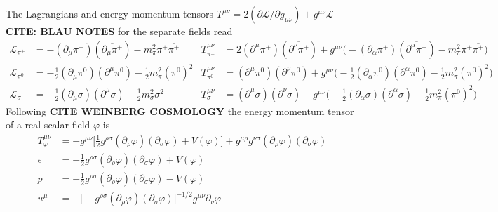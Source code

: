 The Lagrangians and energy-momentum tensors $T^{\mu\nu}=2(\partial\mathscr{L}/\partial g_{\mu\nu})+g^{\mu\nu}\mathscr{L}$ \textbf{CITE: BLAU NOTES} for the separate fields read
\begin{subequations}
    \begin{align}
        \mathscr{L}_{\pi^\pm}&=-(\partial_\mu\pi^+)(\overline{\partial_\mu\pi^+})-m_\pi^2\pi^+\overline{\pi^+}&T^{\mu\nu}_{\pi^\pm}&=2(\partial^\mu\pi^+)(\overline{\partial^\nu\pi^+})+g^{\mu\nu}\big(-(\partial_\alpha\pi^+)(\overline{\partial^\alpha\pi^+})-m_\pi^2\pi^+\overline{\pi^+}\big)\\
        \mathscr{L}_{\pi^0}&=-\frac{1}{2}(\partial_\mu\pi^0)(\partial^\mu\pi^0)-\frac{1}{2}m_\pi^2(\pi^0)^2&T^{\mu\nu}_{\pi^0}&=(\partial^\mu\pi^0)(\partial^\nu\pi^0)+g^{\mu\nu}\big(-\frac{1}{2}(\partial_\alpha\pi^0)(\partial^\alpha\pi^0)-\frac{1}{2}m_\pi^2(\pi^0)^2\big)\\
        \mathscr{L}_\sigma&=-\frac{1}{2}(\partial_\mu\sigma)(\partial^\mu\sigma)-\frac{1}{2}m_\sigma^2\sigma^2&T^{\mu\nu}_{\sigma}&=(\partial^\mu\sigma)(\partial^\nu\sigma)+g^{\mu\nu}\big(-\frac{1}{2}(\partial_\alpha\sigma)(\partial^\alpha\sigma)-\frac{1}{2}m_\pi^2(\pi^0)^2\big)
    \end{align}
\end{subequations}
Following \textbf{CITE WEINBERG COSMOLOGY} the energy momentum tensor of a real scalar field $\varphi$ is
\begin{subequations}
    \begin{align}
        T_\varphi^{\mu\nu}&=-g^{\mu\nu}\big[\frac{1}{2}g^{\rho\sigma}(\partial_\rho\varphi)(\partial_\sigma\varphi)+V(\varphi)\big]+g^{\mu\rho}g^{\nu\sigma}(\partial_\rho\varphi)(\partial_\sigma\varphi)\\
        \epsilon&=-\frac{1}{2}g^{\rho\sigma}(\partial_\rho\varphi)(\partial_\sigma\varphi)+V(\varphi)\\
        p&=-\frac{1}{2}g^{\rho\sigma}(\partial_\rho\varphi)(\partial_\sigma\varphi)-V(\varphi)\\
        u^\mu&=-\big[-g^{\rho\sigma}(\partial_\rho\varphi)(\partial_\sigma\varphi)\big]^{-1/2}g^{\mu\nu}\partial_\nu\varphi
    \end{align}
\end{subequations}